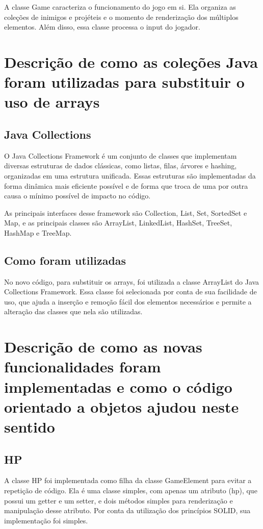 \documentclass[
	12pt,				%
	oneside,			%
	a4paper,			%
	english,			%
	brazil				%
	]{abntex2ppgsi}
\begin{document}
A classe Game caracteriza o funcionamento do jogo em si. Ela organiza as coleções de inimigos e projéteis e o momento de renderização dos múltiplos elementos. Além disso, essa classe processa o input do jogador.

\chapter{Descrição de como as coleções Java foram utilizadas para substituir o uso de arrays}

\section{Java Collections}

O Java Collections Framework é um conjunto de classes que implementam diversas estruturas de dados clássicas, como listas, filas, árvores e hashing, organizadas em uma estrutura unificada. Essas estruturas são implementadas da forma dinâmica mais eficiente possível e de forma que troca de uma por outra causa o mínimo possível de impacto no código.

As principais interfaces desse framework são Collection, List, Set, SortedSet e Map, e as principais classes são ArrayList, LinkedList, HashSet, TreeSet, HashMap e TreeMap.

\section{Como foram utilizadas}

No novo código, para substituir os arrays, foi utilizada a classe ArrayList do Java Collections Framework. Essa classe foi selecionada por conta de sua facilidade de uso, que ajuda a inserção e remoção fácil dos elementos necessários e permite a alteração das classes que nela são utilizadas.

\chapter{Descrição de como as novas funcionalidades foram implementadas e como o código orientado a objetos ajudou neste sentido}

\section{HP}

A classe HP foi implementada como filha da classe GameElement para evitar a repetição de código. Ela é uma classe simples, com apenas um atributo (hp), que possui um getter e um setter, e dois métodos simples para renderização e manipulação desse atributo. Por conta da utilização dos princípios SOLID, sua implementação foi simples.
\end{document}

